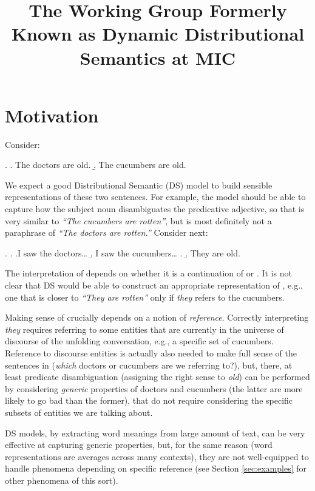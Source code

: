 \documentclass[a4paper,12pt]{article}
\title{The Working Group Formerly Known as Dynamic Distributional
  Semantics at MIC}
\begin{document}
\maketitle

\section{Motivation}
\label{sec:motivation}

Consider:

\ex.\label{ex1} \a. The doctors are old.
\b. The cucumbers are old.

We expect a good Distributional Semantic (DS) model to build sensible
representations of these two sentences. For example, the model should
be able to capture how the subject noun disambiguates the predicative
adjective, so that \Last[b] is very similar to \emph{``The cucumbers
  are rotten''}, but \Last[a] is most definitely not a paraphrase of
\emph{``The doctors are rotten.''} Consider next:

\ex. \label{ex:discourse-context}
\a. \a.I saw the doctors\ldots 
    \b. I saw the cucumbers\ldots
\z.
\b.\label{ex:they-are-old} They are old.

The interpretation of \Last[b] depends on whether it is a continuation
of \Last[a-i] or \Last[a-ii]. It is not clear that DS would be able to
construct an appropriate representation of \Last[b], e.g., one that is
closer to \emph{``They are rotten''} only if \emph{they} refers to the
cucumbers.

Making sense of \Last[b] crucially depends on a notion of
\emph{reference}.  Correctly interpreting \emph{they} requires
referring to some entities that are currently in the universe of
discourse of the unfolding conversation, e.g., a specific set of
cucumbers. Reference to discourse entities is actually also needed to
make full sense of the sentences in \LLast (\emph{which} doctors or
cucumbers are we referring to?), but, there, at least predicate
disambiguation (assigning the right sense to \emph{old}) can be
performed by considering \emph{generic} properties of doctors and
cucumbers (the latter are more likely to go bad than the former), that
do not require considering the specific subsets of entities we are
talking about.

DS models, by extracting word meanings from large amount of text, can
be very effective at capturing generic properties, but, for the same
reason (word representations are averages across many contexts), they
are not well-equipped to handle phenomena depending on specific
reference (see Section \ref{sec:examples} for other phenomena of this
sort).
\end{document}

